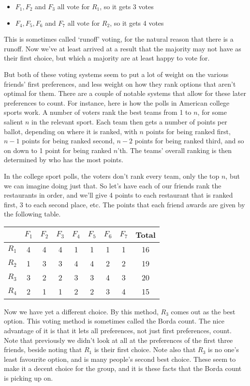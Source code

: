 \documentclass[11pt,]{article}
\providecommand{\tightlist}{%
  \setlength{\itemsep}{0pt}\setlength{\parskip}{0pt}}
\begin{document}
\begin{itemize}
\tightlist
\item
  \(F_1, F_2\) and \(F_3\) all vote for \(R_1\), so it gets 3 votes
\item
  \(F_4, F_5, F_6\) and \(F_7\) all vote for \(R_2\), so it gets 4 votes
\end{itemize}

This is sometimes called `runoff' voting, for the natural reason that
there is a runoff. Now we've at least arrived at a result that the
majority may not have as their first choice, but which a majority are at
least happy to vote for.

But both of these voting systems seem to put a lot of weight on the
various friends' first preferences, and less weight on how they rank
options that aren't optimal for them. There are a couple of notable
systems that allow for these later preferences to count. For instance,
here is how the polls in American college sports work. A number of
voters rank the best teams from 1 to \(n\), for some salient \(n\) in
the relevant sport. Each team then gets a number of points per ballot,
depending on where it is ranked, with \(n\) points for being ranked
first, \(n-1\) points for being ranked second, \(n-2\) points for being
ranked third, and so on down to 1 point for being ranked \(n\)'th. The
teams' overall ranking is then determined by who has the most points.

In the college sport polls, the voters don't rank every team, only the
top \(n\), but we can imagine doing just that. So let's have each of our
friends rank the restaurants in order, and we'll give 4 points to each
restaurant that is ranked first, 3 to each second place, etc. The points
that each friend awards are given by the following table.

\begin{longtable}[]{@{}rcccccccc@{}}
\toprule
& \(F_1\) & \(F_2\) & \(F_3\) & \(F_4\) & \(F_5\) & \(F_6\) & \(F_7\) &
Total\tabularnewline
\midrule
\endhead
\(R_1\) & 4 & 4 & 4 & 1 & 1 & 1 & 1 & 16\tabularnewline
\(R_2\) & 1 & 3 & 3 & 4 & 4 & 2 & 2 & 19\tabularnewline
\(R_3\) & 3 & 2 & 2 & 3 & 3 & 4 & 3 & 20\tabularnewline
\(R_4\) & 2 & 1 & 1 & 2 & 2 & 3 & 4 & 15\tabularnewline
\bottomrule
\end{longtable}

Now we have yet a different choice. By this method, \(R_3\) comes out as
the best option. This voting method is sometimes called the Borda count.
The nice advantage of it is that it lets all preferences, not just first
preferences, count. Note that previously we didn't look at all at the
preferences of the first three friends, beside noting that \(R_1\) is
their first choice. Note also that \(R_3\) is no one's least favourite
option, and is many people's second best choice. These seem to make it a
decent choice for the group, and it is these facts that the Borda count
is picking up on.
\end{document}
